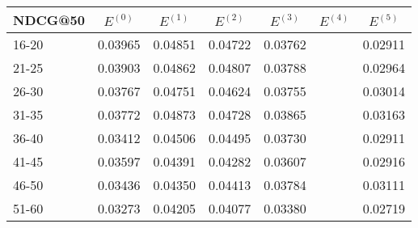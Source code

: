 \begin{table*}[]
    \centering
    \begin{tabular}{|l|l|l|l|l|l|l|}
        \hline
        NDCG@50 & \multicolumn{1}{c|}{$E^{(0)}$} & \multicolumn{1}{c|}{$E^{(1)}$} & \multicolumn{1}{c|}{$E^{(2)}$} & \multicolumn{1}{c|}{$E^{(3)}$} & \multicolumn{1}{c|}{$E^{(4)}$} & \multicolumn{1}{c|}{$E^{(5)}$} \\ \hline
        16-20   & 0.03965                        & 0.04851                        & 0.04722                        & 0.03762                        &                                & 0.02911                                \\ \hline
        21-25   & 0.03903                        & 0.04862                        & 0.04807                        & 0.03788                        &                                & 0.02964                               \\ \hline
        26-30   & 0.03767                        & 0.04751                        & 0.04624                        & 0.03755                        &                                & 0.03014                               \\ \hline
        31-35   & 0.03772                        & 0.04873                        & 0.04728                        & 0.03865                        &                                & 0.03163                               \\ \hline
        36-40   & 0.03412                        & 0.04506                        & 0.04495                        & 0.03730                        &                                & 0.02911                               \\ \hline
        41-45   & 0.03597                        & 0.04391                        & 0.04282                        & 0.03607                        &                                & 0.02916                               \\ \hline
        46-50   & 0.03436                        & 0.04350                        & 0.04413                        & 0.03784                        &                                & 0.03111                               \\ \hline
        51-60   & 0.03273                        & 0.04205                        & 0.04077                        & 0.03380                        &                                & 0.02719                               \\ \hline

\end{tabular}
\end{table*}
